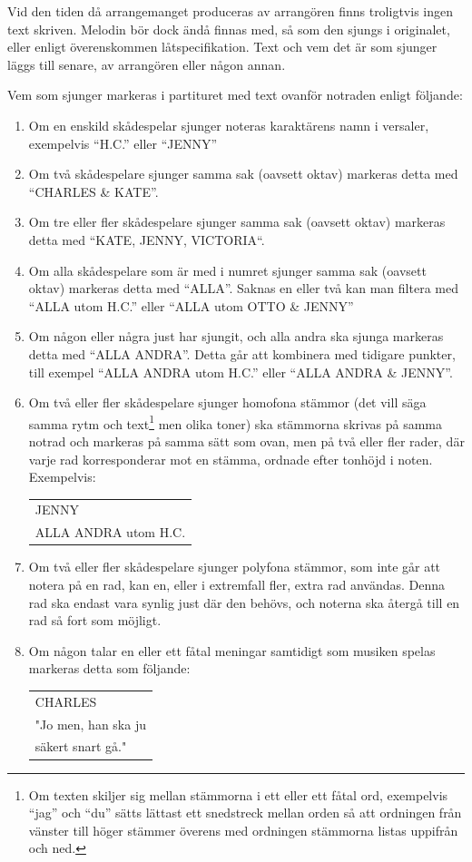 Vid den tiden då arrangemanget produceras av arrangören finns troligtvis ingen text skriven. Melodin bör dock ändå finnas med, så som den sjungs i originalet, eller enligt överenskommen låtspecifikation. Text och vem det är som sjunger läggs till senare, av arrangören eller någon annan.

Vem som sjunger markeras i partituret med text ovanför notraden enligt följande:
\begin{enumerate}
    \item Om en enskild skådespelar sjunger noteras karaktärens namn i versaler, exempelvis ``H.C.'' eller ``JENNY''
    \item Om två skådespelare sjunger samma sak (oavsett oktav) markeras detta med ``CHARLES \& KATE''.
    \item Om tre eller fler skådespelare sjunger samma sak (oavsett oktav) markeras detta med ``KATE, JENNY, VICTORIA``.
    \item Om alla skådespelare som är med i numret sjunger samma sak (oavsett oktav) markeras detta med ``ALLA''. Saknas en eller två kan man filtera med ``ALLA utom H.C.'' eller ``ALLA utom OTTO \& JENNY''
    \item Om någon eller några just har sjungit, och alla andra ska sjunga markeras detta med ``ALLA ANDRA''. Detta går att kombinera med tidigare punkter, till exempel ``ALLA ANDRA utom H.C.'' eller ``ALLA ANDRA \& JENNY''.
    \item Om två eller fler skådespelare sjunger homofona stämmor (det vill säga samma rytm och text\footnote{Om texten skiljer sig mellan stämmorna i ett eller ett fåtal ord, exempelvis ``jag'' och ``du'' sätts lättast ett snedstreck mellan orden så att ordningen från vänster till höger stämmer överens med ordningen stämmorna listas uppifrån och ned.} men olika toner) ska stämmorna skrivas på samma notrad och markeras på samma sätt som ovan, men på två eller fler rader, där varje rad korresponderar mot en stämma, ordnade efter tonhöjd i noten. Exempelvis:
\begin{center}
    \begin{tabular}{l}
JENNY \\
ALLA ANDRA utom H.C.
\end{tabular}
\end{center}

    \item Om två eller fler skådespelare sjunger polyfona stämmor, som inte går att notera på en rad, kan en, eller i extremfall fler, extra rad användas. Denna rad ska endast vara synlig just där den behövs, och noterna ska återgå till en rad så fort som möjligt. 

\item Om någon talar en eller ett fåtal meningar samtidigt som musiken spelas markeras detta som följande: 
\begin{center}
    \begin{tabular}{l}
CHARLES \\
"Jo men, han ska ju \\
säkert snart gå."
\end{tabular}
\end{center}
\end{enumerate}

